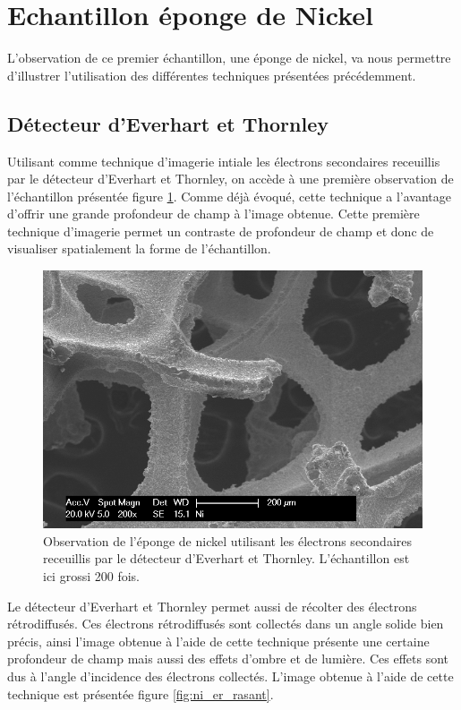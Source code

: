 \documentclass[a4paper,12pt]{article}
\newcommand\ett{Everhart et Thornley\xspace}
\begin{document}
\section{Echantillon éponge de Nickel}

L'observation de ce premier échantillon, une éponge de nickel, va nous permettre d'illustrer l'utilisation des différentes techniques présentées précédemment.

\subsection{Détecteur d'\ett}

Utilisant comme technique d'imagerie intiale les électrons secondaires receuillis par le détecteur d'\ett,
on accède à une première observation de l'échantillon présentée figure \ref{fig:ni_es}. Comme déjà évoqué,
cette technique a l'avantage d'offrir une grande profondeur de champ à l'image obtenue. Cette première
technique d'imagerie permet un contraste de profondeur de champ et donc de visualiser spatialement la forme
de l'échantillon.

\begin{figure}
\centering
\includegraphics[width = 0.7 \textwidth]{images/ni_es.png}
\caption{Observation de l'éponge de nickel utilisant les électrons secondaires receuillis par le détecteur d'\ett. L'échantillon est ici grossi 200 fois.}
\label{fig:ni_es}
\end{figure}

Le détecteur d'\ett permet aussi de récolter des électrons rétrodiffusés. Ces électrons rétrodiffusés sont
collectés dans un angle solide bien précis, ainsi l'image obtenue à l'aide de cette technique présente une
certaine profondeur de champ mais aussi des effets d'ombre et de lumière. Ces effets sont dus à l'angle
d'incidence des électrons collectés. L'image obtenue à l'aide de cette technique est présentée figure
\ref{fig:ni_er_rasant}.
\end{document}
